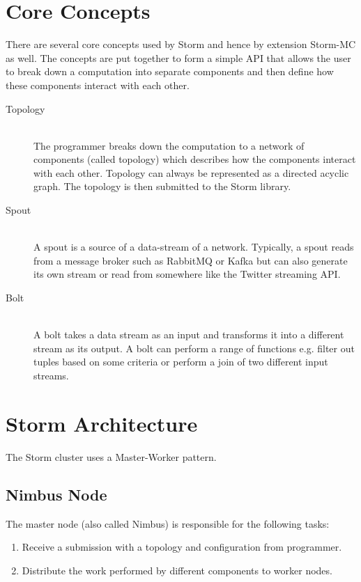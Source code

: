 \documentclass[bsc,frontabs,twoside,singlespacing,normalheadings,parskip,logo]{infthesis}     %
\begin{document}
\section{Core Concepts}

There are several core concepts used by Storm and hence by extension Storm-MC as well. The concepts are put together to form a simple API that allows the user to break down a computation into separate components and then define how these components interact with each other.

\begin{description}
  \item[Topology] \hfill \\
  The programmer breaks down the computation to a network of components (called topology) which describes how the components interact with each other. Topology can always be represented as a directed acyclic graph. The topology is then submitted to the Storm library.
  \item[Spout] \hfill \\
  A spout is a source of a data-stream of a network. Typically, a spout reads from a message broker such as RabbitMQ or Kafka but can also generate its own stream or read from somewhere like the Twitter streaming API.
  \item[Bolt] \hfill \\
  A bolt takes a data stream as an input and transforms it into a different stream as its output. A bolt can perform a range of functions e.g. filter out tuples based on some criteria or perform a join of two different input streams.
\end{description}

\section{Storm Architecture}


The Storm cluster uses a Master-Worker pattern.

\subsection{Nimbus Node}

The master node (also called Nimbus) is responsible for the following tasks:

\begin{enumerate}
	\item Receive a submission with a topology and configuration from programmer.
	\item Distribute the work performed by different components to worker nodes.
\end{enumerate}
\end{document}
